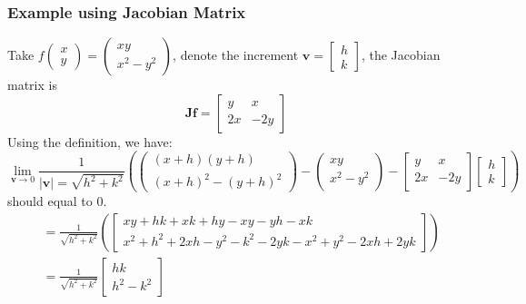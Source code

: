 \documentclass{article}
\begin{document}
\subsubsection{Example using Jacobian Matrix}
Take $f\begin{pmatrix}
    x\\
    y
\end{pmatrix} = \begin{pmatrix}
    xy\\
    x^2 - y^2
\end{pmatrix}$, denote the increment $\mathbf{v} = \begin{bmatrix}
    h\\
    k
\end{bmatrix}$, the Jacobian matrix is
\begin{equation*}
    \mathbf{Jf}=\begin{bmatrix}
        y& x\\
        2x& -2y
    \end{bmatrix}
\end{equation*}
Using the definition, we have:
\begin{equation*}
    \lim_{\mathbf{v}\rightarrow 0} \frac{1}{|\mathbf{v}|=\sqrt{h^2+k^2}}
    \left(
        \begin{pmatrix}
            (x+h)(y+h)\\
            (x+h)^2 - (y+h)^2
        \end{pmatrix} - \begin{pmatrix}
            xy\\
            x^2 - y^2
        \end{pmatrix} - \begin{bmatrix}
            y& x\\
            2x& -2y
        \end{bmatrix} \begin{bmatrix}
            h\\
            k
        \end{bmatrix}
    \right)
\end{equation*}
should equal to $0$.
\begin{equation*}
    \begin{split}
        &= \frac{1}{\sqrt{h^2+k^2}}
        \left(
            \begin{bmatrix}
                xy+hk+xk+hy-xy-yh-xk\\
                x^2+h^2+2xh-y^2-k^2-2yk-x^2+y^2-2xh+2yk
            \end{bmatrix}
        \right)\\
        &=\frac{1}{\sqrt{h^2+k^2}}\begin{bmatrix}
            hk\\
            h^2 - k^2
        \end{bmatrix}
    \end{split}
\end{equation*}
\end{document}
